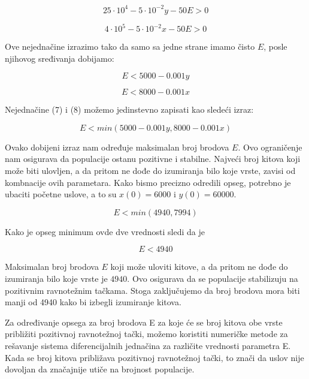 \documentclass[a4paper]{article}
\begin{document}
{	\[
		25 \cdot 10^{4} - 5 \cdot 10^{-2} y - 50E > 0
	\]	  
	
	\[
		4 \cdot 10^{5} - 5 \cdot 10^{-2} x - 50E > 0
	\]
	
	Ove nejednačine izrazimo tako da samo sa jedne strane imamo čisto $E$, posle njihovog sređivanja dobijamo:
	
	\begin{equation}
		E < 5000 - 0.001y
	\end{equation}

	\begin{equation}
		E < 8000 - 0.001x
	\end{equation}
	
	Nejednačine (7) i (8) možemo jedinstevno zapisati kao sledeći izraz:
	
	\begin{equation}
		E < min(5000 - 0.001y, 8000 - 0.001x)
	\end{equation}

	Ovako dobijeni izraz nam određuje maksimalan broj brodova $E$. Ovo ograničenje nam osigurava da populacije ostanu pozitivne i stabilne. Najveći broj kitova koji može biti ulovljen, a da pritom ne dođe do izumiranja bilo koje vrste, zavisi od kombnacije ovih parametara. Kako bismo precizno odredili opseg, potrebno je ubaciti početne uslove, a to su $x(0) = 6000$ i $y(0) = 60000$.
	
	\begin{equation}
		E < min(4940, 7994)
	\end{equation}

	Kako je opseg minimum ovde dve vrednosti sledi da je 
	
	\begin{equation}
		E < 4940
	\end{equation}
		
	
	Maksimalan broj brodova $E$ koji može uloviti kitove, a da pritom ne dođe do izumiranja bilo koje vrste je $4940$. Ovo osigurava da se populacije stabilizuju na pozitivnim ravnotežnim tačkama. Stoga zaključujemo da broj brodova mora biti manji od 4940 kako bi izbegli izumiranje kitova.
	
	
	
	\iffalse
	Za određivanje opsega za broj brodova E za koje će se broj kitova obe vrste približiti pozitivnoj ravnotežnoj tački, možemo koristiti numeričke metode za rešavanje sistema diferencijalnih jednačina za različite vrednosti parametra E. Kada se broj kitova približava pozitivnoj ravnotežnoj tački, to znači da uslov nije dovoljan da značajnije utiče na brojnost populacije. \\
	
}
\end{document}
